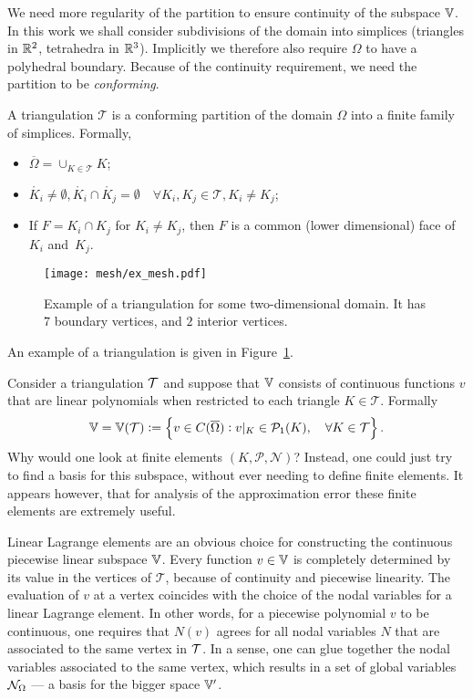 \documentclass[thesis.tex]{subfiles}
\begin{document}
  We need more regularity of the partition to ensure continuity of the subspace $\mathbb{V}$.  In this work  we shall consider subdivisions of the domain into simplices (triangles in $\mathbb{R}^2$, tetrahedra in $\mathbb{R}^3$). Implicitly we therefore also require $\Omega$ to have a polyhedral boundary. Because of the continuity requirement, we need the partition to be \emph{conforming}.
  \begin{defn}
    A triangulation $\mathcal{T}$ is a conforming partition of the domain $\Omega$ into a finite family of simplices.
    Formally,
    \begin{itemize}
      \item $\overline{\Omega} = \cup_{K \in \mathcal{T}} K$;
      \item $\mathring{K_i} \ne \emptyset, \mathring{K_i} \cap \mathring{K_j} = \emptyset \quad \forall K_i, K_j \in \mathcal{T}, K_i \ne K_j$;
    \item If $F = K_i \cap K_j$ for $K_i \ne K_j$, then $F$ is a common (lower dimensional) face of $K_i$ and~$K_j$.
  \end{itemize}
  \end{defn}
  \begin{figure}
    \centering
    \texttt{[image: mesh/ex\_mesh.pdf]}
    \caption{Example of a triangulation for some two-dimensional domain. It has $7$ boundary vertices, and $2$ interior vertices.}
    \label{fig:triangulation}
  \end{figure} 
  An example of a triangulation is given in Figure~\ref{fig:triangulation}.

  Consider a triangulation $\mathcal{T}$ and suppose that $\mathbb{V}$ consists
  of continuous functions $v$ that are linear polynomials when restricted to each triangle $K \in \mathcal{T}$. Formally
  \begin{equation}
    \label{eq:linlagr}
    \mathbb{V} = \mathbb{V}(\mathcal{T}) := \set{v \in C(\overline{\Omega}) : v|_{K} \in \mathcal{P}_1(K), \quad \forall K \in \mathcal{T}}.
  \end{equation}
  Why
  would one look at finite elements $(K, \mathcal{P}, \mathcal{N})$? 
  Instead, one could just try to find a basis for this subspace, without ever needing to define finite elements.
  It appears however, that for analysis of the approximation error these finite elements are extremely useful.

  Linear Lagrange elements are an obvious choice for constructing the continuous piecewise linear subspace $\mathbb{V}$.
  Every function $v \in \mathbb{V}$ is completely determined by its value in the vertices of $\mathcal{T}$, 
  because of continuity and piecewise linearity.
  The evaluation of $v$ at a vertex coincides with the choice of the nodal variables for a linear Lagrange element. 
  In other words, for a piecewise polynomial $v$ to be continuous, one requires that $N(v)$ agrees for all nodal variables $N$
  that are associated to the same vertex in $\mathcal{T}$. In a sense, one can glue together
  the nodal variables associated to the same vertex, which results in a set of global variables $\mathcal{N}_\Omega$ --- 
  a basis for the bigger space $\mathbb{V}'$. 
  
\end{document}
